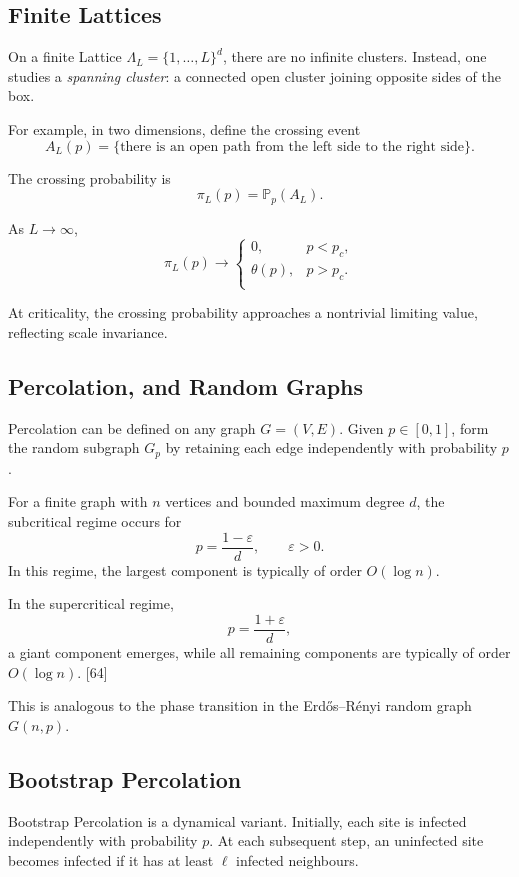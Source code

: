 \documentclass[a4paper, 10pt, onepage]{elegantbook}
\begin{document}
{\subsection{Finite Lattices}

On a finite Lattice \(\Lambda_L=\{1,\ldots,L\}^d\), there are no infinite
clusters. Instead, one studies a \emph{spanning cluster}: a connected open
cluster joining opposite sides of the box.

For example, in two dimensions, define the crossing event
\[
A_L(p)
=
\{\text{there is an open path from the left side to the right side}\}.
\]

The crossing probability is
\[
\pi_L(p)
=
\mathbb P_p(A_L).
\]

As \(L\to\infty\),
\[
\pi_L(p)
\to
\begin{cases}
0, & p<p_c, \\
\theta(p), & p>p_c.  \\
\end{cases}
\]

At criticality, the crossing probability approaches a nontrivial limiting value,
reflecting scale invariance.

\subsection{Percolation, and Random Graphs}

Percolation can be defined on any graph \(G=(V,E)\). Given \(p\in[0,1]\),
form the random subgraph \(G_p\) by retaining each edge independently with
probability \(p\).

For a finite graph with \(n\) vertices and bounded maximum degree \(d\), the
subcritical regime occurs for
\[
p=\frac{1-\varepsilon}{d},
\qquad
\varepsilon>0.
\]
In this regime, the largest component is typically of order \(O(\log n)\).

In the supercritical regime,
\[
p=\frac{1+\varepsilon}{d},
\]
a giant component emerges, while all remaining components are typically of order
\(O(\log n)\). [64]

This is analogous to the phase transition in the Erd\H{o}s--R\'enyi random
graph \(G(n,p)\).

\subsection{Bootstrap Percolation}

Bootstrap Percolation is a dynamical variant. Initially, each site is infected
independently with probability \(p\). At each subsequent step, an uninfected
site becomes infected if it has at least \(\ell\) infected neighbours.

}
\end{document}

